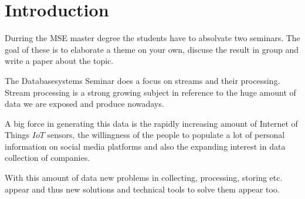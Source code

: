\chapter{Introduction}
\label{introduction}

Durring the MSE master degree the students have to absolvate two seminars.
The goal of these is to elaborate a theme on your own, discuse the result in group and write a paper about the topic.

The Databasesystems Seminar does a focus on streams and their processing.
Stream processing is a strong growing subject in reference to the huge amount of data we are exposed and produce nowadays.

A big force in generating this data is the rapidly increasing amount of Internet of Things \(IoT\) sensors,
the willingness of the people to populate a lot of personal information on social media platforms and
also the expanding interest in data collection of companies.

With this amount of data new problems in collecting, processing, storing etc. appear
and thus new solutions and technical tools to solve them appear too.